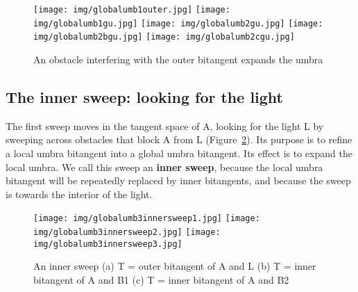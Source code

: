 \documentclass[9pt]{article}
\begin{document}
\begin{figure}[h]
\begin{center}
\texttt{[image: img/globalumb1outer.jpg]}
\texttt{[image: img/globalumb1gu.jpg]}
\texttt{[image: img/globalumb2gu.jpg]}
\texttt{[image: img/globalumb2bgu.jpg]}
\texttt{[image: img/globalumb2cgu.jpg]}
\end{center}
\caption{An obstacle interfering with the outer bitangent expands the umbra}
\label{fig:globalumb2}
\end{figure}


\subsection{The inner sweep: looking for the light}
\label{sec:innersweep}

The first sweep moves in the tangent space of A,
looking for the light L by sweeping across obstacles that block A from L
(Figure~\ref{fig:innersweep}).
Its purpose is to refine a local umbra bitangent into a global umbra
bitangent.
Its effect is to expand the local umbra.
We call this sweep an {\bf inner sweep},
because the local umbra bitangent will be repeatedly replaced by 
inner bitangents, and because the sweep is towards the interior of the light.

\begin{figure}[h]
\begin{center}
\texttt{[image: img/globalumb3innersweep1.jpg]}
\texttt{[image: img/globalumb3innersweep2.jpg]}
\texttt{[image: img/globalumb3innersweep3.jpg]}
\end{center}
\caption{An inner sweep
	 (a) T = outer bitangent of A and L
	 (b) T = inner bitangent of A and B1
	 (c) T = inner bitangent of A and B2}
\label{fig:innersweep}
\end{figure}
\end{document}
